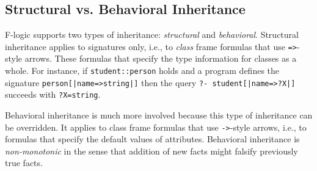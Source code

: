\documentclass[11pt]{article}
\newcommand{\fl}{\mbox{F-logic}\xspace}
\begin{document}
\subsection{Structural vs. Behavioral Inheritance}

\fl supports two types of inheritance: \emph{structural} and
\emph{behavioral}.  Structural inheritance applies to signatures only,
i.e., to \emph{class} frame formulas that use \texttt{=>}-style arrows.
These formulas that specify the type information for classes as a whole.
For instance, if {\tt student::person} holds and a program defines the signature
\texttt{person[|name=>string|]} then the query {\tt ?- student[|name=>?X|]}
succeeds with {\tt ?X=string}.

Behavioral inheritance is much more
involved because this type of inheritance can be overridden. It applies to
class frame formulas that use
\texttt{->}-style arrows, i.e., to formulas that specify the default values
of attributes. Behavioral inheritance is \emph{non-monotonic} in the sense that
addition of new facts might falsify previously true facts.
\end{document}
